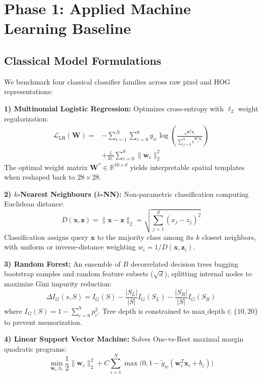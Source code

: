 \documentclass[conference]{IEEEtran}
\newcommand{\R}{\mathbb{R}}
\begin{document}
\section{Phase 1: Applied Machine Learning Baseline}\label{sec:phase1}

\subsection{Classical Model Formulations}
We benchmark four classical classifier families across raw pixel and HOG representations:

\textbf{1) Multinomial Logistic Regression:} Optimizes cross-entropy with $\ell_2$ weight regularization:
\begin{equation}
\begin{aligned}
\mathcal{L}_{\text{LR}}(\mathbf{W}) = &-\sum_{i=1}^N \sum_{c=0}^9 y_{ic} \log \left(\frac{e^{\mathbf{w}_c^T \mathbf{x}_i}}{\sum_{j=0}^9 e^{\mathbf{w}_j^T \mathbf{x}_i}}\right) \\
&+ \frac{1}{2C} \sum_{c=0}^9 \|\mathbf{w}_c\|_2^2
\end{aligned}
\end{equation}
The optimal weight matrix $\mathbf{W}^* \in \R^{10 \times d}$ yields interpretable spatial templates when reshaped back to $28 \times 28$.

\textbf{2) $k$-Nearest Neighbours ($k$-NN):} Non-parametric classification computing Euclidean distance:
\begin{equation}
D(\mathbf{x}, \mathbf{z}) = \|\mathbf{x} - \mathbf{z}\|_2 = \sqrt{\sum_{j=1}^d (x_j - z_j)^2}
\end{equation}
Classification assigns query $\mathbf{x}$ to the majority class among its $k$ closest neighbors, with uniform or inverse-distance weighting $w_i = 1 / D(\mathbf{x}, \mathbf{z}_i)$.

\textbf{3) Random Forest:} An ensemble of $B$ decorrelated decision trees bagging bootstrap samples and random feature subsets ($\sqrt{d}$), splitting internal nodes to maximize Gini impurity reduction:
\begin{equation}
\Delta I_G(s, S) = I_G(S) - \frac{|S_L|}{|S|} I_G(S_L) - \frac{|S_R|}{|S|} I_G(S_R)
\end{equation}
where $I_G(S) = 1 - \sum_{c=0}^9 p_c^2$. Tree depth is constrained to $\text{max\_depth} \in \{10, 20\}$ to prevent memorization.

\textbf{4) Linear Support Vector Machine:} Solves One-vs-Rest maximal margin quadratic programs:
\begin{equation}
\min_{\mathbf{w}_c, b_c} \frac{1}{2} \|\mathbf{w}_c\|_2^2 + C \sum_{i=1}^N \max\big(0, 1 - \tilde{y}_{ic}(\mathbf{w}_c^T \mathbf{x}_i + b_c)\big)
\end{equation}
\end{document}
